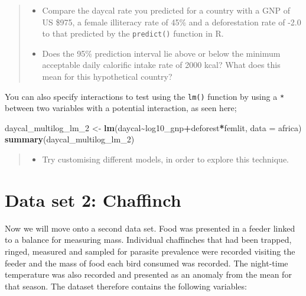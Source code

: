 \documentclass[
]{book}
\newenvironment{Shaded}{\begin{snugshade}}{\end{snugshade}}
\newcommand{\AttributeTok}[1]{\textcolor[rgb]{0.13,0.29,0.53}{#1}}
\newcommand{\FunctionTok}[1]{\textcolor[rgb]{0.13,0.29,0.53}{\textbf{#1}}}
\newcommand{\NormalTok}[1]{#1}
\newcommand{\OtherTok}[1]{\textcolor[rgb]{0.56,0.35,0.01}{#1}}
\newcommand{\SpecialCharTok}[1]{\textcolor[rgb]{0.81,0.36,0.00}{\textbf{#1}}}
\providecommand{\tightlist}{%
  \setlength{\itemsep}{0pt}\setlength{\parskip}{0pt}}
\begin{document}
\begin{quote}
\begin{itemize}
\tightlist
\item
  Compare the daycal rate you predicted for a country with a GNP of US \$975, a female illiteracy rate of 45\% and a deforestation rate of -2.0 to that predicted by the \texttt{predict()} function in R.
\item
  Does the 95\% prediction interval lie above or below the minimum acceptable daily calorific intake rate of 2000 kcal? What does this mean for this hypothetical country?
\end{itemize}
\end{quote}

You can also specify interactions to test using the \texttt{lm()} function by using a \texttt{*} between two variables with a potential interaction, as seen here;

\begin{Shaded}
\begin{Highlighting}[]
\NormalTok{daycal\_multilog\_lm\_2 }\OtherTok{\textless{}{-}} \FunctionTok{lm}\NormalTok{(daycal}\SpecialCharTok{\textasciitilde{}}\NormalTok{log10\_gnp}\SpecialCharTok{+}\NormalTok{deforest}\SpecialCharTok{*}\NormalTok{femlit, }\AttributeTok{data =}\NormalTok{ africa)}
\FunctionTok{summary}\NormalTok{(daycal\_multilog\_lm\_2)}
\end{Highlighting}
\end{Shaded}

\begin{quote}
\begin{itemize}
\tightlist
\item
  Try customising different models, in order to explore this technique.
\end{itemize}
\end{quote}

\hypertarget{data-set-2-chaffinch}{%
\section{Data set 2: Chaffinch}\label{data-set-2-chaffinch}}

Now we will move onto a second data set. Food was presented in a feeder linked to a balance for measuring mass. Individual chaffinches that had been trapped, ringed, measured and sampled for parasite prevalence were recorded visiting the feeder and the mass of food each bird consumed was recorded. The night-time temperature was also recorded and presented as an anomaly from the mean for that season. The dataset therefore contains the following variables:
\end{document}

